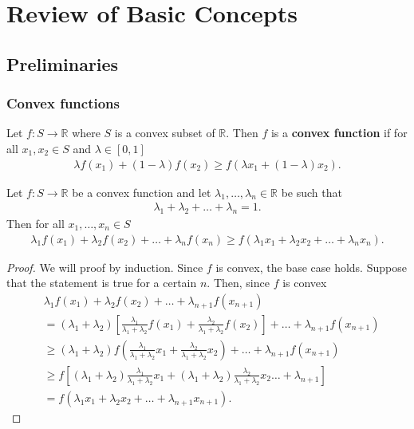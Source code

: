 \documentclass{memoir}
\begin{document}
\chapter{Review of Basic Concepts}
\section{Preliminaries}
\subsection{Convex functions}
\begin{definition}
    Let $f:S\to \mathbb{R}$ where $S$ is a convex subset of $\mathbb{R}$. Then $f$ is a \textbf{convex function} if for all $x_1,x_2 \in S$ and $\lambda \in [0,1]$
    \begin{align*}
        \lambda f(x_1) + (1- \lambda)f(x_2) \ge f( \lambda x_1 + (1- \lambda) x_2).
    \end{align*}
\end{definition}

\begin{theorem}
    Let $f:S \to \mathbb{R}$ be a convex function and let $\lambda_1,\ldots,\lambda_n \in \mathbb{R}$ be such that
    \begin{align*}
        \lambda_1 + \lambda_2 + \ldots + \lambda_n = 1.
    \end{align*}
    Then for all $x_1,\ldots,x_n \in S$
    \begin{align*}
        \lambda_1 f(x_1) + \lambda_2 f(x_2) + \ldots + \lambda_n f(x_n) \ge f(\lambda_1 x_1 + \lambda_2 x_2 + \ldots + \lambda_n x_n).
    \end{align*}
\end{theorem}
\begin{proof}
    We will proof by induction. Since $f$ is convex, the base case holds. Suppose that the statement is true for a certain $n$. Then, since $f$ is convex
    \begin{align*}
        &\lambda_1 f(x_1) + \lambda_2 f(x_2) + \ldots + \lambda_{n+1} f(x_{n+1}) \\
        &= (\lambda_1+\lambda_2)\left[\frac{\lambda_1}{\lambda_1 + \lambda_2} f(x_1) + \frac{\lambda_2}{\lambda_1+\lambda_2}f(x_2)\right] + \ldots + \lambda_{n+1} f(x_{n+1})  \\
        &\ge (\lambda_1 + \lambda_2)f\left( \frac{\lambda_1}{\lambda_1 + \lambda_2} x_1 + \frac{\lambda_2}{\lambda_1+\lambda_2}x_2\right) + \ldots + \lambda_{n+1} f(x_{n+1}) \\
        &\ge f\left[(\lambda_1 + \lambda_2) \frac{\lambda_1}{\lambda_1 + \lambda_2} x_1 + (\lambda_1 + \lambda_2)\frac{\lambda_2}{\lambda_1+\lambda_2}x_2\ldots + \lambda_{n+1}\right] \\
        &= f(\lambda_1 x_1 + \lambda_2 x_2 + \ldots + \lambda_{n+1} x_{n+1}).
    \end{align*}
\end{proof}
\end{document}
